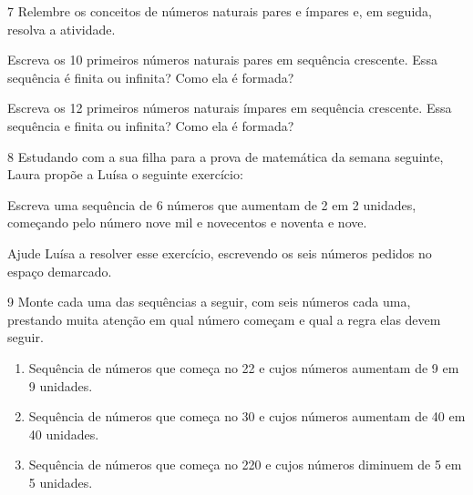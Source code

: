 \num{7} Relembre os conceitos de números naturais pares e ímpares e, em
seguida, resolva a atividade.

\begin{escolha}
\item
  Escreva os 10 primeiros números naturais pares em sequência crescente.
  Essa sequência é finita ou infinita? Como ela é formada?


\item
  Escreva os 12 primeiros números naturais ímpares em sequência
  crescente. Essa sequência e finita ou infinita? Como ela é formada?

\end{escolha}

\num{8} Estudando com a sua filha para a prova de matemática da semana
seguinte, Laura propõe a Luísa o seguinte exercício:

Escreva uma sequência de 6 números que aumentam de 2 em 2 unidades,
começando pelo número nove mil e novecentos e noventa e nove.

Ajude Luísa a resolver esse exercício, escrevendo os seis números pedidos no espaço demarcado.


\num{9} Monte cada uma das sequências a seguir, com seis números cada uma,
prestando muita atenção em qual número começam e qual a regra elas devem
seguir.

\begin{enumerate}
\item
  Sequência de números que começa no 22 e cujos números aumentam de 9 em 9 unidades.


\item
  Sequência de números que começa no 30 e cujos números aumentam de 40 em 40 unidades.


\item
  Sequência de números que começa no 220 e cujos números diminuem de 5 em 5 unidades.

\end{enumerate}

